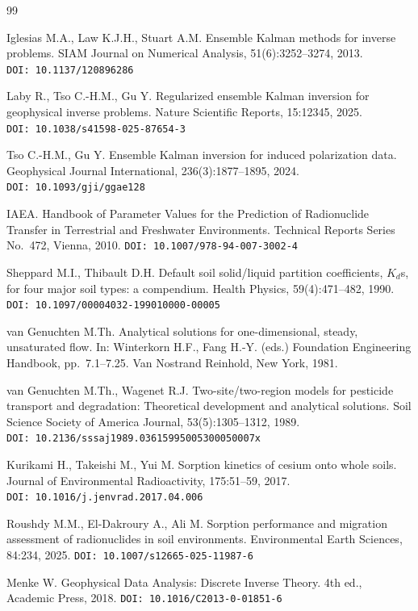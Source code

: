 \documentclass[12pt,a4paper]{article}
\begin{document}
\begin{thebibliography}{99}
{
Iglesias M.A., Law K.J.H., Stuart A.M.
Ensemble Kalman methods for inverse problems.
SIAM Journal on Numerical Analysis, 51(6):3252--3274, 2013.
\texttt{DOI:~10.1137/120896286}

Laby R., Tso C.-H.M., Gu Y.
Regularized ensemble Kalman inversion for geophysical inverse problems.
Nature Scientific Reports, 15:12345, 2025.
\texttt{DOI:~10.1038/s41598-025-87654-3}

Tso C.-H.M., Gu Y.
Ensemble Kalman inversion for induced polarization data.
Geophysical Journal International, 236(3):1877--1895, 2024.
\texttt{DOI:~10.1093/gji/ggae128}

IAEA.
Handbook of Parameter Values for the Prediction of Radionuclide
Transfer in Terrestrial and Freshwater Environments.
Technical Reports Series No.~472, Vienna, 2010.
\texttt{DOI:~10.1007/978-94-007-3002-4}

Sheppard M.I., Thibault D.H.
Default soil solid/liquid partition coefficients, $K_d$s,
for four major soil types: a compendium.
Health Physics, 59(4):471--482, 1990.
\texttt{DOI:~10.1097/00004032-199010000-00005}

van Genuchten M.Th.
Analytical solutions for one-dimensional, steady, unsaturated flow.
In: Winterkorn H.F., Fang H.-Y. (eds.) Foundation Engineering Handbook,
pp.~7.1--7.25. Van Nostrand Reinhold, New York, 1981.

van Genuchten M.Th., Wagenet R.J.
Two-site/two-region models for pesticide transport and degradation:
Theoretical development and analytical solutions.
Soil Science Society of America Journal, 53(5):1305--1312, 1989.
\texttt{DOI:~10.2136/sssaj1989.03615995005300050007x}

Kurikami H., Takeishi M., Yui M.
Sorption kinetics of cesium onto whole soils.
Journal of Environmental Radioactivity, 175:51--59, 2017.
\texttt{DOI:~10.1016/j.jenvrad.2017.04.006}

Roushdy M.M., El-Dakroury A., Ali M.
Sorption performance and migration assessment of radionuclides
in soil environments.
Environmental Earth Sciences, 84:234, 2025.
\texttt{DOI:~10.1007/s12665-025-11987-6}

Menke W.
Geophysical Data Analysis: Discrete Inverse Theory.
4th ed., Academic Press, 2018.
\texttt{DOI:~10.1016/C2013-0-01851-6}

}
\end{thebibliography}
\end{document}
